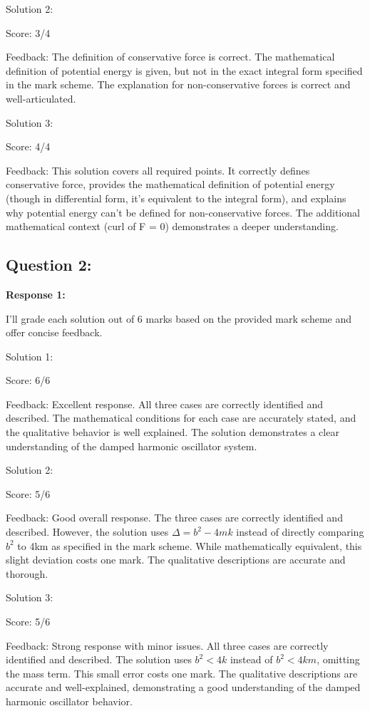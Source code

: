 \documentclass[a4paper,11pt]{article}
\begin{document}
Solution 2:

Score: 3/4

Feedback: The definition of conservative force is correct. The mathematical definition of potential energy is given, but not in the exact integral form specified in the mark scheme. The explanation for non-conservative forces is correct and well-articulated.

Solution 3:

Score: 4/4

Feedback: This solution covers all required points. It correctly defines conservative force, provides the mathematical definition of potential energy (though in differential form, it's equivalent to the integral form), and explains why potential energy can't be defined for non-conservative forces. The additional mathematical context (curl of F = 0) demonstrates a deeper understanding.

\subsection*{Question 2:}

\textbf{Response 1:}

I'll grade each solution out of 6 marks based on the provided mark scheme and offer concise feedback.

Solution 1:

Score: 6/6

Feedback: Excellent response. All three cases are correctly identified and described. The mathematical conditions for each case are accurately stated, and the qualitative behavior is well explained. The solution demonstrates a clear understanding of the damped harmonic oscillator system.

Solution 2:

Score: 5/6

Feedback: Good overall response. The three cases are correctly identified and described. However, the solution uses \(\Delta = b^2 - 4mk \) instead of directly comparing \(b^2\) to 4km as specified in the mark scheme. While mathematically equivalent, this slight deviation costs one mark. The qualitative descriptions are accurate and thorough.

Solution 3:

Score: 5/6

Feedback: Strong response with minor issues. All three cases are correctly identified and described. The solution uses \(b^2 < 4k \) instead of \(b^2 < 4km\), omitting the mass term. This small error costs one mark. The qualitative descriptions are accurate and well-explained, demonstrating a good understanding of the damped harmonic oscillator behavior.
\end{document}
